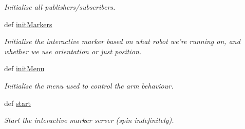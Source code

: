 \begin{DoxyCompactItemize}
\begin{DoxyCompactList}\small\item\em \-Initialise all publishers/subscribers. \end{DoxyCompactList}\item 
def \hyperlink{classhrl__haptic__mpc_1_1mpc__teleop__rviz_1_1_m_p_c_teleop_interactive_markers_a91f038b13d8f1b83a3df06a490749512}{init\-Markers}
\begin{DoxyCompactList}\small\item\em \-Initialise the interactive marker based on what robot we're running on, and whether we use orientation or just position. \end{DoxyCompactList}\item 
def \hyperlink{classhrl__haptic__mpc_1_1mpc__teleop__rviz_1_1_m_p_c_teleop_interactive_markers_a8f474b999f56ccdcb1177de4322359a3}{init\-Menu}
\begin{DoxyCompactList}\small\item\em \-Initialise the menu used to control the arm behaviour. \end{DoxyCompactList}\item 
def \hyperlink{classhrl__haptic__mpc_1_1mpc__teleop__rviz_1_1_m_p_c_teleop_interactive_markers_a9032c452b9418cf2a2f4c2cfe267c0f2}{start}
\begin{DoxyCompactList}\small\item\em \-Start the interactive marker server (spin indefinitely). \end{DoxyCompactList}\end{DoxyCompactItemize}
